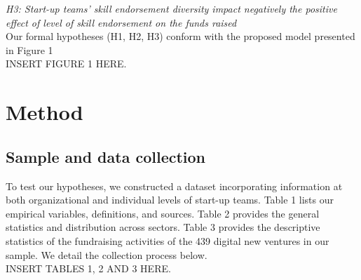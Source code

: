 \documentclass[12pt]{article}
\begin{document}
\noindent \textit{H3: Start-up teams' skill endorsement diversity impact negatively the positive effect of level of skill endorsement on the funds raised} \\

Our formal hypotheses (H1, H2, H3) conform with the proposed model presented in Figure 1 \\

INSERT FIGURE 1 HERE.

\section{Method}

\subsection{Sample and data collection}

To test our hypotheses, we constructed a dataset incorporating information at both organizational and individual levels of start-up teams. Table 1\label{table1} lists our empirical variables, definitions, and sources. Table 2\label{table2} provides the general statistics and distribution across sectors. Table 3\label{table3} provides the descriptive statistics of the fundraising activities of the 439 digital new ventures in our sample. We detail the collection process below. \\

INSERT TABLES 1, 2 AND 3 HERE. \\
\end{document}
